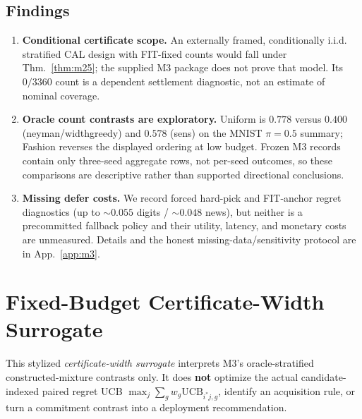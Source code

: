 \documentclass{article}
\begin{document}
\subsection{Findings}
\begin{enumerate}
\item \textbf{Conditional certificate scope.} An externally framed, conditionally i.i.d.
stratified CAL design with FIT-fixed counts would fall under Thm.~\ref{thm:m25}; the supplied
M3 package does not prove that model. Its $0/3360$ count is a dependent settlement diagnostic,
not an estimate of nominal coverage.
\item \textbf{Oracle count contrasts are exploratory.} Uniform is $0.778$ versus $0.400$
(neyman/widthgreedy) and $0.578$ (sens) on the MNIST $\pi{=}0.5$ summary; Fashion reverses
the displayed ordering at low budget. Frozen M3 records contain only three-seed aggregate
rows, not per-seed outcomes, so these comparisons are descriptive rather than supported
directional conclusions.
\item \textbf{Missing defer costs.} We record forced hard-pick and FIT-anchor regret
diagnostics (up to $\sim0.055$ digits / $\sim0.048$ news), but neither is a precommitted
fallback policy and their utility, latency, and monetary costs are unmeasured. Details and the
honest missing-data/sensitivity protocol are in App.~\ref{app:m3}.
\end{enumerate}

\section{Fixed-Budget Certificate-Width Surrogate}
\label{sec:m35}

This stylized \emph{certificate-width surrogate} interprets M3's oracle-stratified
constructed-mixture contrasts only. It does \textbf{not} optimize the actual candidate-indexed
paired regret UCB $\max_j\sum_g w_g\mathrm{UCB}_{i^*j,g}$, identify an acquisition rule, or
turn a commitment contrast into a deployment recommendation.
\end{document}
